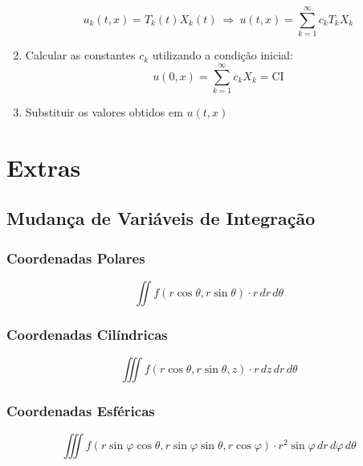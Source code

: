 \documentclass[11pt, a4paper]{article}
\begin{document}
\begin{enumerate}
          \begin{equation*}
              u_k(t, x) = T_k(t) X_k(t) \ \Rightarrow \
              u(t,x) = \sum_{k=1}^{\infty} c_k T_k X_k
          \end{equation*}
    \item Calcular as constantes $c_k$ utilizando a condição inicial:
          \begin{equation*}
              u(0,x) = \sum_{k=1}^{\infty} c_k X_k = \text{CI}
          \end{equation*}
    \item Substituir os valores obtidos em $u(t,x)$
\end{enumerate}

\newpage

\section{Extras}

\subsection{Mudança de Variáveis de Integração}

\subsubsection{Coordenadas Polares}

\begin{equation*}
    \iint f(r\cos\theta, r\sin\theta) \cdot r\,dr\,d\theta
\end{equation*}

\subsubsection{Coordenadas Cilíndricas}

\begin{equation*}
    \iiint f(r\cos\theta, r\sin\theta, z) \cdot r\,dz\,dr\,d\theta
\end{equation*}

\subsubsection{Coordenadas Esféricas}

\begin{equation*}
    \iiint f(r\sin\varphi\cos\theta, r\sin\varphi\sin\theta, r\cos\varphi) \cdot r^2\sin\varphi\,dr\,d\varphi\,d\theta
\end{equation*}
\end{document}
